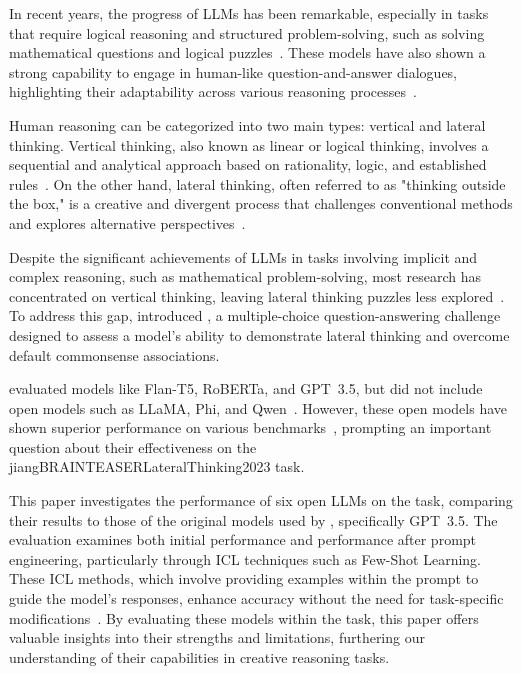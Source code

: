 In recent years, the progress of \acp{LLM} has been remarkable, especially in tasks that require logical reasoning and structured problem-solving, such as solving mathematical questions and logical puzzles~\cite{panLogicLMEmpoweringLarge2023,zebazeTreeProblemsImproving2024,yuFlowReasoningTraining2025}. These models have also shown a strong capability to engage in human-like question-and-answer dialogues, highlighting their adaptability across various reasoning processes~\cite{haoRecentProgressLeveraging2022, panLogicLMEmpoweringLarge2023,zebazeTreeProblemsImproving2024,yuFlowReasoningTraining2025}.

Human reasoning can be categorized into two main types: vertical and lateral thinking. Vertical thinking, also known as linear or logical thinking, involves a sequential and analytical approach based on rationality, logic, and established rules~\cite{jiangBRAINTEASERLateralThinking2023}. On the other hand, lateral thinking, often referred to as "thinking outside the box," is a creative and divergent process that challenges conventional methods and explores alternative perspectives~\cite{jiangBRAINTEASERLateralThinking2023}.

Despite the significant achievements of \acp{LLM} in tasks involving implicit and complex reasoning, such as mathematical problem-solving, most research has concentrated on vertical thinking, leaving lateral thinking puzzles less explored~\cite{jiangBRAINTEASERLateralThinking2023,chenWeakevalStrongEvaluatingEliciting2024,huangLatEvalInteractiveLLMs2024}. To address this gap, \textcite{jiangBRAINTEASERLateralThinking2023} introduced , a multiple-choice question-answering challenge designed to assess a model's ability to demonstrate lateral thinking and overcome default commonsense associations.

\textcite{jiangBRAINTEASERLateralThinking2023} evaluated models like Flan-T5, RoBERTa, and \acs{GPT}~3.5, but did not include open models such as \acs{LLaMA}, \acs{Phi}, and \acs{Qwen}~\cite{jiangBRAINTEASERLateralThinking2023}. However, these open
models have shown superior performance on various benchmarks~\cite{OpenLLMLeaderboard},
prompting an important question about their effectiveness on the \citetitle
{jiangBRAINTEASERLateralThinking2023} task.

This paper investigates the performance of six open \acp{LLM} on the  task, comparing their results to those of the original models used by \textcite{jiangBRAINTEASERLateralThinking2023}, specifically \acs{GPT}~3.5. The evaluation examines both initial performance and performance after prompt engineering, particularly through \ac{ICL} techniques such as Few-Shot Learning. These \ac{ICL} methods, which involve providing examples within the prompt to guide the model’s responses, enhance accuracy without the need for task-specific modifications~\cite{yinDeeperInsightsUpdates2024,brownLanguageModelsAre2020}. By evaluating these models within the  task, this paper offers valuable insights into their strengths and limitations, furthering our understanding of their capabilities in creative reasoning tasks.